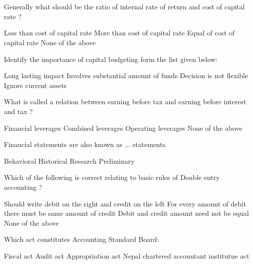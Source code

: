 \section*{}
\begin{questions}

\question Generally what should be the ratio of internal rate of return and cost of capital rate ?
  \begin{choices}
  \choice Less than cost of capital rate
  \choice More than cost of capital rate
  \choice Equal of cost of capital rate
  \choice None of the above
  \end{choices}

\question Identify the importance of capital budgeting form the list given below:
  \begin{choices}
  \choice Long lasting impact
  \choice Involves substantial amount of funds
  \choice Decision is not flexible
  \choice Ignore current assets
  \end{choices}

\question What is called a relation between earning before tax and earning before interest and tax ?
  \begin{choices}
  \choice Financial leverages
  \choice Combined leverages
  \choice Operating leverages
  \choice None of the above
  \end{choices}

\question Financial statements are also known as ... statements.
  \begin{choices}
  \choice Behavioral
  \choice Historical
  \choice Research
  \choice Preliminary
  \end{choices}

\question Which of the following is correct relating to basic rules of Double entry accounting ?
  \begin{choices}
  \choice Should write debit on the right and credit on the left
  \choice For every amount of debit there must be same amount of credit
  \choice Debit and credit amount need not be equal
  \choice None of the above
  \end{choices}

\question Which act constitutes Accounting Standard Board:
  \begin{choices}
  \choice Fiscal act
  \choice Audit act
  \choice Appropriation act
  \choice Nepal chartered accountant institutue act
  \end{choices}


\end{questions}
